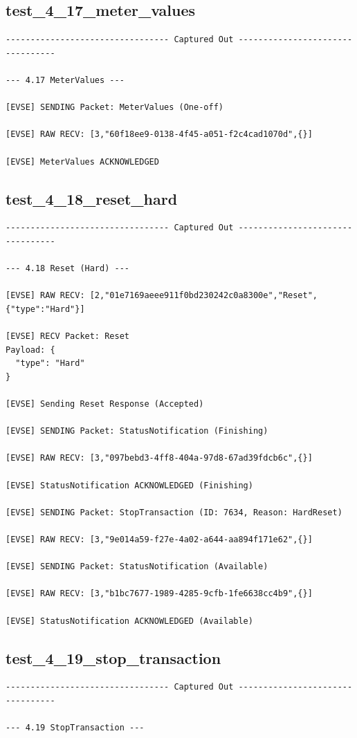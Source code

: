 \documentclass{article}
\begin{document}
\subsection*{test\_4\_17\_meter\_values}
\begin{lstlisting}
--------------------------------- Captured Out ---------------------------------

--- 4.17 MeterValues ---

[EVSE] SENDING Packet: MeterValues (One-off)

[EVSE] RAW RECV: [3,"60f18ee9-0138-4f45-a051-f2c4cad1070d",{}]

[EVSE] MeterValues ACKNOWLEDGED
\end{lstlisting}
\subsection*{test\_4\_18\_reset\_hard}
\begin{lstlisting}
--------------------------------- Captured Out ---------------------------------

--- 4.18 Reset (Hard) ---

[EVSE] RAW RECV: [2,"01e7169aeee911f0bd230242c0a8300e","Reset",{"type":"Hard"}]

[EVSE] RECV Packet: Reset
Payload: {
  "type": "Hard"
}

[EVSE] Sending Reset Response (Accepted)

[EVSE] SENDING Packet: StatusNotification (Finishing)

[EVSE] RAW RECV: [3,"097bebd3-4ff8-404a-97d8-67ad39fdcb6c",{}]

[EVSE] StatusNotification ACKNOWLEDGED (Finishing)

[EVSE] SENDING Packet: StopTransaction (ID: 7634, Reason: HardReset)

[EVSE] RAW RECV: [3,"9e014a59-f27e-4a02-a644-aa894f171e62",{}]

[EVSE] SENDING Packet: StatusNotification (Available)

[EVSE] RAW RECV: [3,"b1bc7677-1989-4285-9cfb-1fe6638cc4b9",{}]

[EVSE] StatusNotification ACKNOWLEDGED (Available)
\end{lstlisting}
\subsection*{test\_4\_19\_stop\_transaction}
\begin{lstlisting}
--------------------------------- Captured Out ---------------------------------

--- 4.19 StopTransaction ---
\end{lstlisting}
\end{document}
